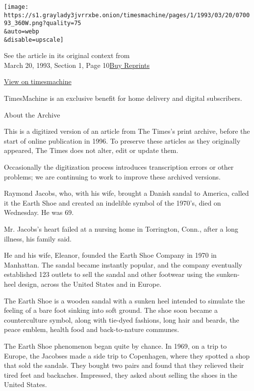 \texttt{[image: https://s1.graylady3jvrrxbe.onion/timesmachine/pages/1/1993/03/20/070093\_360W.png?quality=75\\\&auto=webp\\\&disable=upscale]}

See the article in its original context from\\
March 20, 1993, Section 1, Page
10\href{https://store.nytimes3xbfgragh.onion/collections/new-york-times-page-reprints?utm_source=nytimes\&utm_medium=article-page\&utm_campaign=reprints}{Buy
Reprints}

\href{http://timesmachine.nytimes3xbfgragh.onion/timesmachine/1993/03/20/070093.html}{View
on timesmachine}

TimesMachine is an exclusive benefit for home delivery and digital
subscribers.

About the Archive

This is a digitized version of an article from The Times's print
archive, before the start of online publication in 1996. To preserve
these articles as they originally appeared, The Times does not alter,
edit or update them.

Occasionally the digitization process introduces transcription errors or
other problems; we are continuing to work to improve these archived
versions.

Raymond Jacobs, who, with his wife, brought a Danish sandal to America,
called it the Earth Shoe and created an indelible symbol of the 1970's,
died on Wednesday. He was 69.

Mr. Jacobs's heart failed at a nursing home in Torrington, Conn., after
a long illness, his family said.

He and his wife, Eleanor, founded the Earth Shoe Company in 1970 in
Manhattan. The sandal became instantly popular, and the company
eventually established 123 outlets to sell the sandal and other footwear
using the sunken-heel design, across the United States and in Europe.

The Earth Shoe is a wooden sandal with a sunken heel intended to
simulate the feeling of a bare foot sinking into soft ground. The shoe
soon became a counterculture symbol, along with tie-dyed fashions, long
hair and beards, the peace emblem, health food and back-to-nature
communes.

The Earth Shoe phenomenon began quite by chance. In 1969, on a trip to
Europe, the Jacobses made a side trip to Copenhagen, where they spotted
a shop that sold the sandals. They bought two pairs and found that they
relieved their tired feet and backaches. Impressed, they asked about
selling the shoes in the United States.

